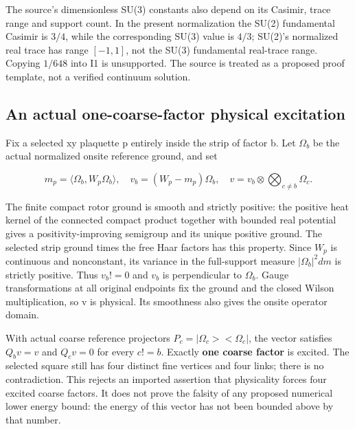 The source's dimensionless SU(3) constants also depend on its Casimir, trace range and support count. In the present normalization the SU(2) fundamental Casimir is \(3/4\), while the corresponding SU(3) value is \(4/3\); SU(2)'s normalized real trace has range \([-1,1]\), not the SU(3) fundamental real-trace range. Copying \(1/648\) into I1 is unsupported. The source is treated as a proposed proof template, not a verified continuum solution.

\hypertarget{r29-am1-an-actual-one-coarse-factor-physical-excitation}{%
\subsection{An actual one-coarse-factor physical excitation}\label{r29:am1:r29-am1-an-actual-one-coarse-factor-physical-excitation}}

Fix a selected xy plaquette p entirely inside the strip of factor b. Let \(\Omega_b\) be the actual normalized onsite reference ground, and set

\begin{equation}
m_p=\langle\Omega_b,W_p\Omega_b\rangle,\quad
v_b=(W_p-m_p)\Omega_b,\quad
v=v_b\mathbin\otimes\!\bigotimes_{c\ne b}\Omega_c .
\tag{HNM-AM1.1}
\label{r29:am1:eq1}
\end{equation}

The finite compact rotor ground is smooth and strictly positive: the positive heat kernel of the connected compact product together with bounded real potential gives a positivity-improving semigroup and its unique positive ground. The selected strip ground times the free Haar factors has this property. Since \(W_p\) is continuous and nonconstant, its variance in the full-support measure \(|\Omega_b|^{2}dm\) is strictly positive. Thus \(v_b!=0\) and \(v_b\) is perpendicular to \(\Omega_b\). Gauge transformations at all original endpoints fix the ground and the closed Wilson multiplication, so v is physical. Its smoothness also gives the onsite operator domain.

With actual coarse reference projectors \(P_c=|\Omega_c><\Omega_c|\), the vector satisfies \(Q_b v=v\) and \(Q_c v=0\) for every \(c!=b\). Exactly \textbf{one coarse factor} is excited. The selected square still has four distinct fine vertices and four links; there is no contradiction. This rejects an imported assertion that physicality forces four excited coarse factors. It does not prove the falsity of any proposed numerical lower energy bound: the energy of this vector has not been bounded above by that number.

